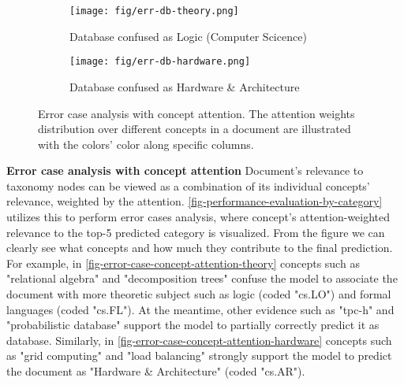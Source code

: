 \begin{figure}[!ht]
  \begin{subfigure}[c]{.4\textwidth}
                \centering
                \texttt{[image: fig/err-db-theory.png]}
                \caption{Database confused as Logic (Computer Scicence)}
                \label{fig-error-case-concept-attention-theory}
  \end{subfigure}\hfill
  
  \begin{subfigure}[c]{.4\textwidth}
        \centering
        \texttt{[image: fig/err-db-hardware.png]}
        \caption{Database confused as Hardware & Architecture}
        \vspace{-10pt}
        \label{fig-error-case-concept-attention-hardware}
  \end{subfigure}
\label{fig-error-case-concept-attention}
\vspace{15pt}
\caption{Error case analysis with concept attention. The attention weights  distribution over different concepts in a document are illustrated with the colors' color along specific columns.
}
\vspace{-10pt}
\end{figure}

\noindent \textbf{Error case analysis with concept attention}
Document's relevance to taxonomy nodes can be viewed as a combination of its individual concepts' relevance, weighted by the attention. 
\autoref{fig-performance-evaluation-by-category} utilizes this to perform error cases analysis, where concept's attention-weighted relevance to the top-5 predicted category is visualized.
From the figure we can clearly see what concepts and how much they contribute to the final prediction. 
For example, in \autoref{fig-error-case-concept-attention-theory} concepts such as "relational algebra" and "decomposition trees" confuse the model to associate the document with more theoretic subject such as logic (coded "cs.LO") and formal languages (coded "cs.FL").
At the meantime, other evidence such as "tpc-h" and "probabilistic database" support the model to partially correctly predict it as database.
Similarly, in \autoref{fig-error-case-concept-attention-hardware} concepts such as "grid computing" and "load balancing" strongly support the model to predict the document as "Hardware \& Architecture" (coded "cs.AR").






